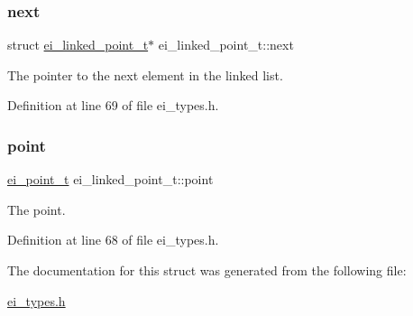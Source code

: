 \subsubsection{\texorpdfstring{next}{next}}
{\footnotesize\ttfamily struct \hyperlink{structei__linked__point__t}{ei\+\_\+linked\+\_\+point\+\_\+t}$\ast$ ei\+\_\+linked\+\_\+point\+\_\+t\+::next}



The pointer to the next element in the linked list. 



Definition at line 69 of file ei\+\_\+types.\+h.

\mbox{\label{structei__linked__point__t_a5774a3902514ef5c0f599829894c56a6}} 
\subsubsection{\texorpdfstring{point}{point}}
{\footnotesize\ttfamily \hyperlink{structei__point__t}{ei\+\_\+point\+\_\+t} ei\+\_\+linked\+\_\+point\+\_\+t\+::point}



The point. 



Definition at line 68 of file ei\+\_\+types.\+h.



The documentation for this struct was generated from the following file\+:\begin{DoxyCompactItemize}
\item 
\hyperlink{ei__types_8h}{ei\+\_\+types.\+h}\end{DoxyCompactItemize}
